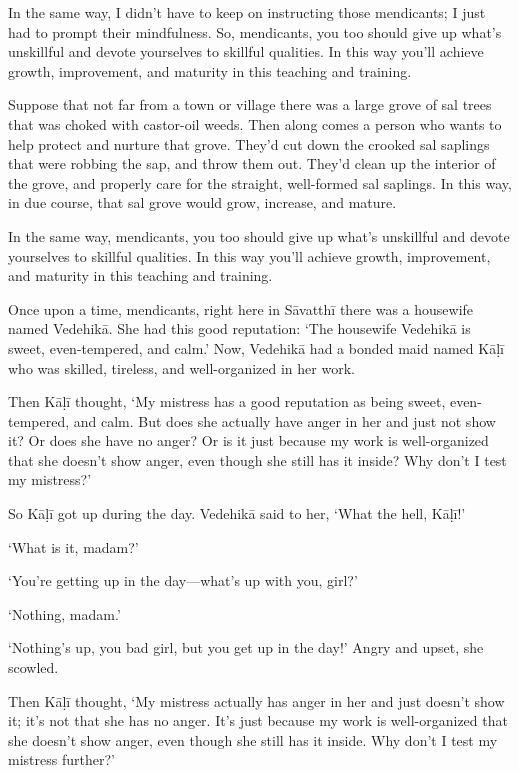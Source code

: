 \documentclass[12pt,openany]{book}%
\begin{document}
In the same way, I didn’t have to keep on instructing those mendicants; I just had to prompt their mindfulness. So, mendicants, you too should give up what’s unskillful and devote yourselves to skillful qualities. In this way you’ll achieve growth, improvement, and maturity in this teaching and training. 

Suppose that not far from a town or village there was a large grove of sal trees that was choked with castor-oil weeds. Then along comes a person who wants to help protect and nurture that grove. They’d cut down the crooked sal saplings that were robbing the sap, and throw them out. They’d clean up the interior of the grove, and properly care for the straight, well-formed sal saplings. In this way, in due course, that sal grove would grow, increase, and mature. 

In the same way, mendicants, you too should give up what’s unskillful and devote yourselves to skillful qualities. In this way you’ll achieve growth, improvement, and maturity in this teaching and training. 

Once upon a time, mendicants, right here in \textsanskrit{Sāvatthī} there was a housewife named \textsanskrit{Vedehikā}. She had this good reputation: ‘The housewife \textsanskrit{Vedehikā} is sweet, even-tempered, and calm.’ Now, \textsanskrit{Vedehikā} had a bonded maid named \textsanskrit{Kāḷī} who was skilled, tireless, and well-organized in her work. 

Then \textsanskrit{Kāḷī} thought, ‘My mistress has a good reputation as being sweet, even-tempered, and calm. But does she actually have anger in her and just not show it? Or does she have no anger? Or is it just because my work is well-organized that she doesn’t show anger, even though she still has it inside? Why don’t I test my mistress?’ 

So \textsanskrit{Kāḷī} got up during the day. \textsanskrit{Vedehikā} said to her, ‘What the hell, \textsanskrit{Kāḷī}!’ 

‘What is it, madam?’ 

‘You’re getting up in the day—what’s up with you, girl?’ 

‘Nothing, madam.’ 

‘Nothing’s up, you bad girl, but you get up in the day!’ Angry and upset, she scowled. 

Then \textsanskrit{Kāḷī} thought, ‘My mistress actually has anger in her and just doesn’t show it; it’s not that she has no anger. It’s just because my work is well-organized that she doesn’t show anger, even though she still has it inside. Why don’t I test my mistress further?’ 
\end{document}
